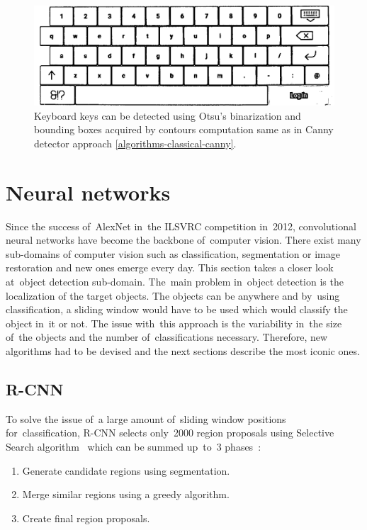 \begin{figure}[hbt]
	\includegraphics[width=1\textwidth]{img/algorithms/thresholding-otsu.png}
	\caption{Keyboard keys can be detected using Otsu's binarization and bounding boxes acquired by contours computation same as in Canny detector approach \ref{algorithms-classical-canny}.}
	\label{algorithms-thresholding-otsu}
\end{figure}

\section{Neural networks}
\label{algorithms-nn}
Since the success of~AlexNet in~the ILSVRC competition in~2012, convolutional neural networks have become the backbone of~computer vision. There exist many sub-domains of computer vision such as classification, segmentation or image restoration and new ones emerge every day. This section takes a closer look at~object detection sub-domain. The~main problem in~object detection is the localization of the target objects. The objects can be anywhere and by~using classification, a sliding window would have to be used which would classify the object in~it or not. The issue with~this approach is the variability in~the size of~the objects and the number of~classifications necessary. Therefore, new algorithms had to be devised and the next sections describe the most iconic ones.

\subsection{R-CNN}
\label{algorithms-nn-rcnn}
To solve the issue of~a large amount of~sliding window positions for~classification, R-CNN selects only~2000 region proposals using Selective Search algorithm~\cite{selective-search} which can be summed up~to~3 phases~\cite{r-cnn-medium}:

\begin{enumerate}[topsep=0pt,itemsep=-1.5pt,partopsep=6pt]
    \item Generate candidate regions using segmentation.
    \item Merge similar regions using a greedy algorithm.
    \item Create final region proposals.
\end{enumerate}

